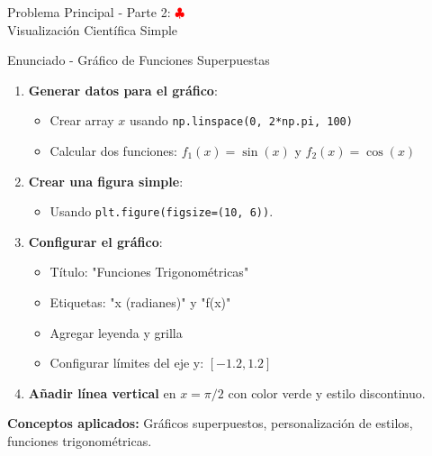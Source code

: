 \documentclass[10pt]{beamer}
\begin{document}
\begin{frame}{Problema Principal - Parte 2: \hfill \textcolor{red}{$\clubsuit$} \\ Visualización Científica Simple}
  \begin{block}{Enunciado - Gráfico de Funciones Superpuestas}
    \begin{enumerate}
      \item \textbf{Generar datos para el gráfico}:
        \begin{itemize}
          \item Crear array $x$ usando \texttt{np.linspace(0, 2*np.pi, 100)}
          \item Calcular dos funciones: $f_1(x) = \sin(x)$ y $f_2(x) = \cos(x)$
        \end{itemize}
      \item \textbf{Crear una figura simple}:
      \begin{itemize}
        \item Usando \texttt{plt.figure(figsize=(10, 6))}.
      \end{itemize}
      \item \textbf{Configurar el gráfico}:
        \begin{itemize}
          \item Título: "Funciones Trigonométricas"
          \item Etiquetas: "x (radianes)" y "f(x)"
          \item Agregar leyenda y grilla
          \item Configurar límites del eje y: $[-1.2, 1.2]$
        \end{itemize}
      \item \textbf{Añadir línea vertical} en $x = \pi/2$ con color verde y estilo discontinuo.
    \end{enumerate}
  \end{block}
  
  \textbf{Conceptos aplicados:} Gráficos superpuestos, personalización de estilos, funciones trigonométricas.
\end{frame}

\end{document}
